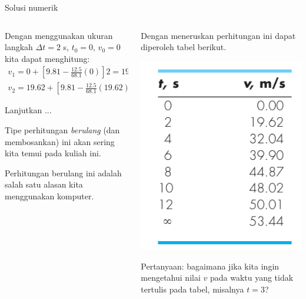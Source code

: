 \begin{frame}{Solusi numerik}

\fontsize{9pt}{10pt}\selectfont

\begin{columns}[T]
\begin{column}{0.5\textwidth}
Dengan menggunakan ukuran langkah $\Delta t = 2$ s, $t_0 = 0$,
\(v_0 = 0\) kita dapat menghitung:
\begin{eqnarray*}
v_1 = 0 + \left[ 9.81 - \frac{12.5}{68.1}(0) \right] 2 = 19.62 \\
v_2 = 19.62 + \left[ 9.81 - \frac{12.5}{68.1}(19.62) \right] 2 = 32.04
\end{eqnarray*}

Lanjutkan ...

Tipe perhitungan \emph{berulang} (dan membosankan)
ini akan sering kita temui pada kuliah ini.

Perhitungan berulang ini adalah salah satu alasan kita
menggunakan komputer.


\end{column}

\begin{column}{0.5\textwidth}

Dengan meneruskan perhitungan ini dapat diperoleh tabel berikut.

{\centering
\includegraphics[height=0.4\textheight]{../chapra_7th/Chapra_Example_1_2_table.png}
\par}

Pertanyaan: bagaimana jika kita ingin mengetahui nilai $v$ pada waktu yang
tidak tertulis pada tabel, misalnya $t=3$?

\end{column}

\end{columns}

\end{frame}



